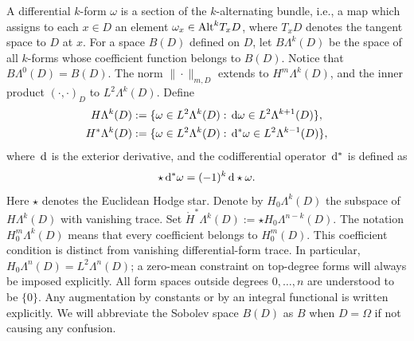 \documentclass[10pt]{amsart}
\numberwithin{equation}{section}
\newcommand{\dd}{\,{\rm d}}
\begin{document}
A differential $k$-form $\omega$ is a section of the $k$-alternating bundle, i.e., a map which assigns to each $x \in D$ an element $\omega_x\in{\rm Alt}^kT_x D$, where $T_x D$ denotes the tangent space to $D$ at $x$.
For a space $B(D)$ defined on $D$, let $B\Lambda^k(D)$ be the space of all $k$-forms whose coefficient function belongs to $B(D)$. Notice that $B\Lambda^0(D)=B(D)$.
The norm $\|\cdot\|_{m,D}$ extends to $H^m\Lambda^k(D)$, and the inner product $(\cdot,\cdot)_D$ to $L^2\Lambda^k(D)$.
Define 
\begin{align*}
	H\Lambda^k(D)&:=\{\omega\in L^2\Lambda^k(D): \dd\omega\in L^2\Lambda^{k+1}(D)\},\\
	H^{*}\Lambda^k(D)&:=\{\omega\in L^2\Lambda^k(D): \dd^*\omega\in L^2\Lambda^{k-1}(D)\},
\end{align*}
where $\dd$ is the exterior derivative, and 
the codifferential operator $\dd^*$ is defined as
\begin{equation}\label{eq:stardelta}
	\star\dd^*\omega=(-1)^k\dd\star\omega.
\end{equation}
Here $\star$ denotes the Euclidean Hodge star.
Denote by $H_0\Lambda^k(D)$ the subspace of $H\Lambda^k(D)$ with vanishing trace.
Set $\mathring H^*\Lambda^k(D):=\star H_0\Lambda^{n-k}(D)$.
The notation $H_0^m\Lambda^k(D)$ means that every coefficient belongs to $H_0^m(D)$.
This coefficient condition is distinct from vanishing differential-form trace.
In particular, $H_0\Lambda^n(D)=L^2\Lambda^n(D)$; a zero-mean constraint on top-degree forms will always be imposed explicitly.
All form spaces outside degrees $0,\ldots,n$ are understood to be $\{0\}$.
Any augmentation by constants or by an integral functional is written explicitly.
We will abbreviate the Sobolev space $B(D)$ as $B$ when $D=\Omega$ if not causing any confusion.
\end{document}
